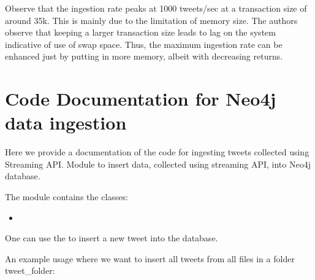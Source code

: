 \documentclass[letterpaper,10pt,english]{sphinxmanual}
\begin{document}
Observe that the ingestion rate peaks at 1000 tweets/sec at a transaction size of around 35k. This is mainly due to the limitation of memory size. The authors observe that keeping a larger transaction size leads to lag on the system indicative of use of swap space. Thus, the maximum ingestion rate can be enhanced just by putting in more memory, albeit with decreasing returns.


\section{Code Documentation for Neo4j data ingestion}
\label{\detokenize{neo4j_data_ingestion:code-documentation-for-neo4j-data-ingestion}}
Here we provide a documentation of the code for ingesting tweets collected using Streaming API.
\label{\detokenize{neo4j_data_ingestion:module-ingest_neo4j_streaming}}
Module to insert data, collected using streaming API, into Neo4j database.

The {\hyperref[\detokenize{neo4j_data_ingestion:module-ingest_neo4j_streaming}]{}} module contains the classes:
\begin{itemize}
\item {} 
{\hyperref[\detokenize{neo4j_data_ingestion:ingest_neo4j_streaming.Twitter}]{}}

\end{itemize}

One can use the  to insert a new tweet into the database.

An example usage where we want to insert all tweets from all files in a folder tweet\_folder:

\begin{sphinxVerbatim}[commandchars=\\\{\}]
  
 
\end{sphinxVerbatim}
\end{document}
